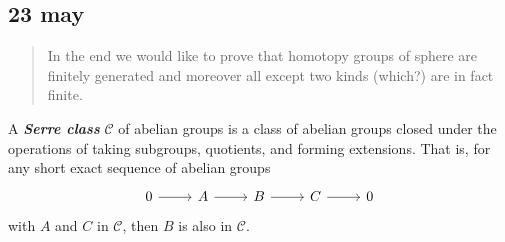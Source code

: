 \documentclass{article}
\newcommand{\Cc}{\mathcal{C}}
\begin{document}
\subsection{23 may}
\begin{quotation}
	In the end we would like to prove that homotopy groups of sphere are finitely generated and moreover all except two kinds ({\color{magenta}which}?) are in fact finite.
\end{quotation}

\begin{defn}
	A \textbf{\textit{Serre class}} $\Cc$ of abelian groups is a class of abelian groups closed under the operations of taking subgroups, quotients, and forming extensions. That is, for any short exact sequence of abelian groups
	\[\begin{tikzcd}
		0\arrow[r]&A\arrow[r]&B\arrow[r]&C\arrow[r]&0
	\end{tikzcd}\]
	with $A$ and $C$ in $\Cc$, then $B$ is also in $\Cc$.
\end{defn}
\end{document}
